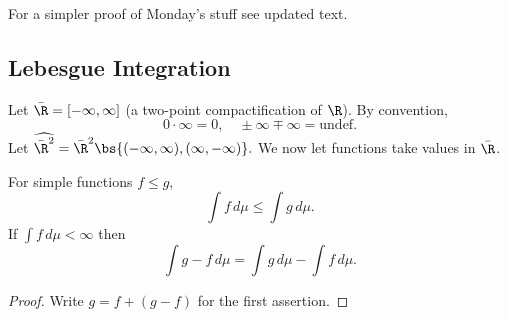 
For a simpler proof of Monday's stuff see updated text.

\subsection{Lebesgue Integration}

Let
$
\bar{\R}=[-\infty,\infty]
$ 
(a two-point compactification of $\R$). By convention,
\[
0\cdot \infty =0,\quad \pm \infty \mp \infty=\text{undef}.
\]
Let $\widehat{\bar{\R}^2}=\bar{\R}^2\bs \{(-\infty,\infty),(\infty,-\infty)\}.$ We now let functions take values in $\bar{\R}$.

\begin{cor}\label{simpleineq}
For simple functions $f\leq g$,
\[
\int f\,d\mu\le \int g\,d\mu.
\]
If $\int f\,d\mu<\infty$ then 
\[
\int g-f \,d\mu=\int g\,d\mu-\int f\,d\mu.
\]
\end{cor}
\begin{proof}
Write $g=f+(g-f)$ for the first assertion.
\end{proof}

